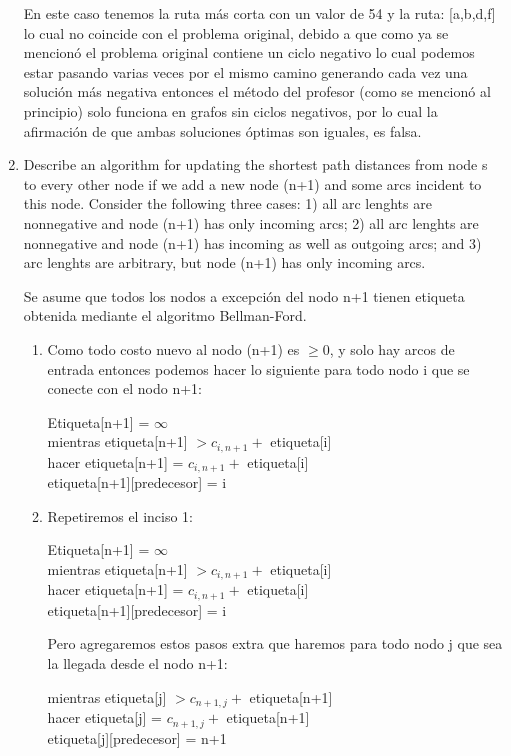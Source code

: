 \documentclass{report}
\begin{document}
\begin{enumerate}
  En este caso tenemos la ruta más corta con un valor de 54 y la ruta: [a,b,d,f] lo cual no coincide con el problema original, debido a que como ya se mencionó el problema original contiene un ciclo negativo lo cual podemos estar pasando varias veces por el mismo camino generando cada vez una solución más negativa entonces el método del profesor (como se mencionó al principio) solo funciona en grafos sin ciclos negativos, por lo cual la afirmación de que ambas soluciones óptimas son iguales, es falsa.

  \item Describe an algorithm for updating the shortest path distances from node s to every other node if we add a new node (n+1) and some arcs incident to this node. Consider the following three cases: 1) all arc lenghts are nonnegative and node (n+1) has only incoming arcs; 2) all arc lenghts are nonnegative and node (n+1) has incoming as well as outgoing arcs; and 3) arc lenghts are arbitrary, but node (n+1) has only incoming arcs.
  
  Se asume que todos los nodos a excepción del nodo n+1 tienen etiqueta obtenida mediante el algoritmo Bellman-Ford.
    \begin{enumerate}[1)]
      \item Como todo costo nuevo al nodo (n+1) es $\geq 0$, y solo hay arcos de entrada entonces podemos hacer lo siguiente para todo nodo i que se conecte con el nodo n+1:
      \begin{center}
        Etiqueta[n+1] = $\infty$ \\ 
        mientras etiqueta[n+1]  $> c_{i,n+1} + $ etiqueta[i] \\
        hacer etiqueta[n+1] = $c_{i,n+1} + $ etiqueta[i] \\
        etiqueta[n+1][predecesor] = i
      \end{center}      

      \item Repetiremos el inciso 1:
      \begin{center}
        Etiqueta[n+1] = $\infty$ \\ 
        mientras etiqueta[n+1]  $> c_{i,n+1} + $ etiqueta[i] \\
        hacer etiqueta[n+1] = $c_{i,n+1} + $ etiqueta[i] \\
        etiqueta[n+1][predecesor] = i
      \end{center}

      Pero agregaremos estos pasos extra que haremos para todo nodo j que sea la llegada desde el nodo n+1:
      \begin{center}
        mientras etiqueta[j]  $> c_{n+1,j} + $ etiqueta[n+1] \\
        hacer etiqueta[j] = $c_{n+1,j} + $ etiqueta[n+1] \\
        etiqueta[j][predecesor] = n+1
      \end{center}


\end{enumerate}
\end{enumerate}
\end{document}
